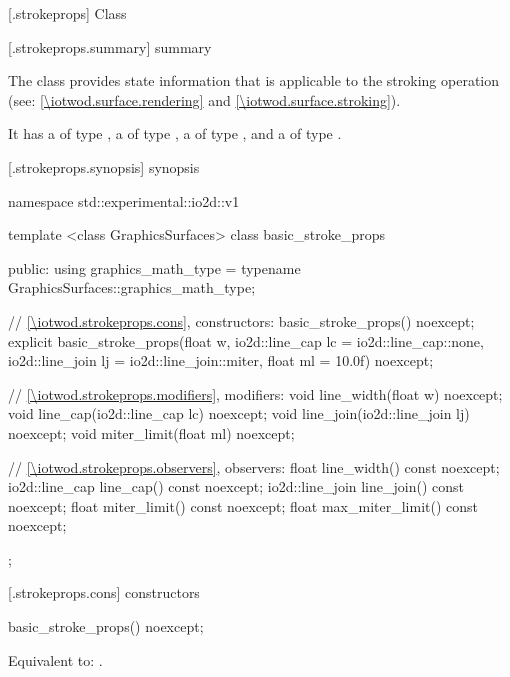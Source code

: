 
 [\iotwod.strokeprops] {Class }

 [\iotwod.strokeprops.summary] { summary}

\pnum
The  class provides state information that is applicable to the stroking operation (see: \ref{\iotwod.surface.rendering} and \ref{\iotwod.surface.stroking}).

\pnum
It has a  of type , a  of type , a  of type , and a  of type .

 [\iotwod.strokeprops.synopsis] { synopsis}

\begin{codeblock}
namespace std::experimental::io2d::v1 {
  template <class GraphicsSurfaces>
  class basic_stroke_props {
  public:
	using graphics_math_type = typename GraphicsSurfaces::graphics_math_type;

    // \ref{\iotwod.strokeprops.cons}, constructors:
    basic_stroke_props() noexcept;
    explicit basic_stroke_props(float w, io2d::line_cap lc = io2d::line_cap::none,
      io2d::line_join lj = io2d::line_join::miter, float ml = 10.0f) noexcept;

    // \ref{\iotwod.strokeprops.modifiers}, modifiers:
    void line_width(float w) noexcept;
    void line_cap(io2d::line_cap lc) noexcept;
    void line_join(io2d::line_join lj) noexcept;
    void miter_limit(float ml) noexcept;

    // \ref{\iotwod.strokeprops.observers}, observers:
    float line_width() const noexcept;
    io2d::line_cap line_cap() const noexcept;
    io2d::line_join line_join() const noexcept;
    float miter_limit() const noexcept;
    float max_miter_limit() const noexcept;
  };
}
\end{codeblock}

 [\iotwod.strokeprops.cons] { constructors}

%
\begin{itemdecl}
basic_stroke_props() noexcept;
\end{itemdecl}
\begin{itemdescr}
\pnum
\effects
Equivalent to: .
\end{itemdescr}

